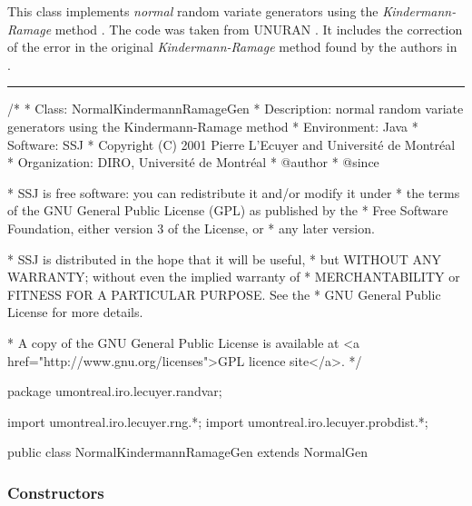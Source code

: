 
This class implements {\em normal\/} random variate generators using
 the {\em Kindermann-Ramage\/} method \cite{rKIN76a}.
The code was taken from UNURAN \cite{iLEY02a}. It includes the correction
of the error in the original {\em Kindermann-Ramage\/} method found by the
authors in \cite{rTIR04a}.


\bigskip\hrule

\begin{code}
\begin{hide}
/*
 * Class:        NormalKindermannRamageGen
 * Description:  normal random variate generators using the Kindermann-Ramage method
 * Environment:  Java
 * Software:     SSJ 
 * Copyright (C) 2001  Pierre L'Ecuyer and Université de Montréal
 * Organization: DIRO, Université de Montréal
 * @author       
 * @since

 * SSJ is free software: you can redistribute it and/or modify it under
 * the terms of the GNU General Public License (GPL) as published by the
 * Free Software Foundation, either version 3 of the License, or
 * any later version.

 * SSJ is distributed in the hope that it will be useful,
 * but WITHOUT ANY WARRANTY; without even the implied warranty of
 * MERCHANTABILITY or FITNESS FOR A PARTICULAR PURPOSE.  See the
 * GNU General Public License for more details.

 * A copy of the GNU General Public License is available at
   <a href="http://www.gnu.org/licenses">GPL licence site</a>.
 */
\end{hide}
package umontreal.iro.lecuyer.randvar;\begin{hide}
import umontreal.iro.lecuyer.rng.*;
import umontreal.iro.lecuyer.probdist.*;
\end{hide}

public class NormalKindermannRamageGen extends NormalGen \begin{hide} {

\end{hide}\end{code}

\subsubsection* {Constructors}

